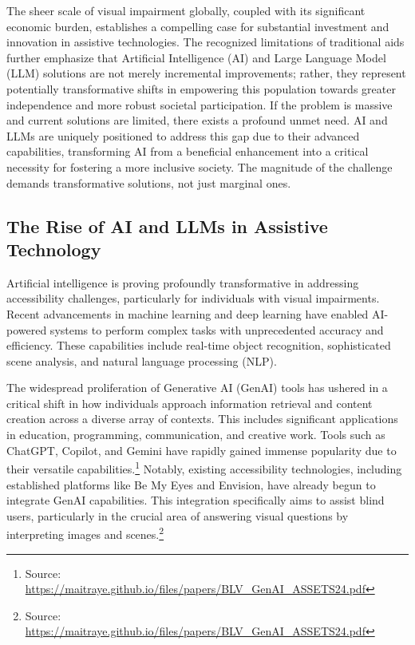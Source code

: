 The sheer scale of visual impairment globally, coupled with its significant economic burden, establishes a compelling case for substantial investment and innovation in assistive technologies. The recognized limitations of traditional aids further emphasize that Artificial Intelligence (AI) and Large Language Model (LLM) solutions are not merely incremental improvements; rather, they represent potentially transformative shifts in empowering this population towards greater independence and more robust societal participation. If the problem is massive and current solutions are limited, there exists a profound unmet need. AI and LLMs are uniquely positioned to address this gap due to their advanced capabilities, transforming AI from a beneficial enhancement into a critical necessity for fostering a more inclusive society. The magnitude of the challenge demands transformative solutions, not just marginal ones.

\subsection{The Rise of AI and LLMs in Assistive Technology}

Artificial intelligence is proving profoundly transformative in addressing accessibility challenges, particularly for individuals with visual impairments. Recent advancements in machine learning and deep learning have enabled AI-powered systems to perform complex tasks with unprecedented accuracy and efficiency. These capabilities include real-time object recognition, sophisticated scene analysis, and natural language processing (NLP).\cite{arxiv_visual_impairment}

The widespread proliferation of Generative AI (GenAI) tools has ushered in a critical shift in how individuals approach information retrieval and content creation across a diverse array of contexts. This includes significant applications in education, programming, communication, and creative work. Tools such as ChatGPT, Copilot, and Gemini have rapidly gained immense popularity due to their versatile capabilities.\footnote{Source: \url{https://maitraye.github.io/files/papers/BLV_GenAI_ASSETS24.pdf}} Notably, existing accessibility technologies, including established platforms like Be My Eyes and Envision, have already begun to integrate GenAI capabilities. This integration specifically aims to assist blind users, particularly in the crucial area of answering visual questions by interpreting images and scenes.\footnote{Source: \url{https://maitraye.github.io/files/papers/BLV_GenAI_ASSETS24.pdf}}

